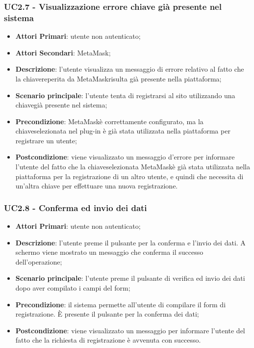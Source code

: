 \subsubsection{UC2.7 - Visualizzazione errore chiave già presente nel sistema}
\begin{itemize}
	\item \textbf{Attori Primari}: utente non autenticato;
	\item \textbf{Attori Secondari}: MetaMask\glo;
	\item \textbf{Descrizione}:
	l'utente visualizza un messaggio di errore relativo al fatto che la chiave\glosp reperita da MetaMask\glosp risulta già presente nella piattaforma;
	\item \textbf{Scenario principale}: l'utente tenta di registrarsi al sito utilizzando una chiave\glosp già presente nel sistema;
	\item \textbf{Precondizione}: MetaMask\glosp è correttamente configurato, ma la chiave\glosp selezionata nel plug-in è già stata utilizzata nella piattaforma per registrare un utente;
	\item \textbf{Postcondizione}: viene visualizzato un messaggio d'errore per informare l'utente del fatto che la chiave\glosp selezionata MetaMask\glosp è già stata utilizzata nella piattaforma per la registrazione di un altro utente, e quindi che necessita di un'altra chiave per effettuare una nuova registrazione.
\end{itemize}

\subsubsection{UC2.8 - Conferma ed invio dei dati}
\begin{itemize}
	\item \textbf{Attori Primari}: utente non autenticato;
	\item \textbf{Descrizione}:
	l'utente preme il pulsante per la conferma e l'invio dei dati. A schermo viene mostrato un messaggio che conferma il successo dell'operazione;
	\item \textbf{Scenario principale}: l'utente preme il pulsante di verifica ed invio dei dati dopo aver compilato i campi del form;
	\item \textbf{Precondizione}: il sistema permette all'utente di compilare il form di registrazione. \`E presente il pulsante per la conferma dei dati;
	\item \textbf{Postcondizione}: viene visualizzato un messaggio per informare l'utente del fatto che la richiesta di registrazione è avvenuta con successo.
\end{itemize}

